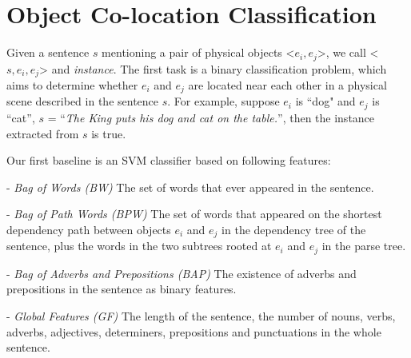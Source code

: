 %
\section{Object Co-location Classification}
\label{sec:classify} 
Given a sentence $s$ mentioning a pair of physical objects 
\textless$e_i,e_j$\textgreater, we call \textless$s,e_i,e_j$\textgreater
and {\em instance}. 
The first task is a binary classification problem, which aims to 
determine whether $e_i$ and $e_j$ are located near each other 
in a physical scene described in the sentence $s$.
For example, suppose $e_i$ is ``dog" and $e_j$ is ``cat'', $s$ = ``\textit{The King puts his dog and cat on the table.}'', 
then the instance extracted from $s$ is true.

Our first baseline is an SVM classifier based on following features:

- \textit{Bag of Words (BW)}
The set of words that ever appeared in the sentence. 

- \textit{Bag of Path Words (BPW)}
The set of words that appeared on
the shortest dependency path between objects $e_i$ and $e_j$ in the 
dependency tree of the sentence, plus the words in the two subtrees 
rooted at $e_i$ and $e_j$ in the parse tree.
 
- \textit{Bag of Adverbs and Prepositions (BAP)}
The existence of adverbs and prepositions in the sentence as binary 
features. 

- \textit{Global Features (GF)}
The length of the sentence, the number of nouns, verbs, adverbs, adjectives, determiners, prepositions and punctuations in the whole sentence. 

